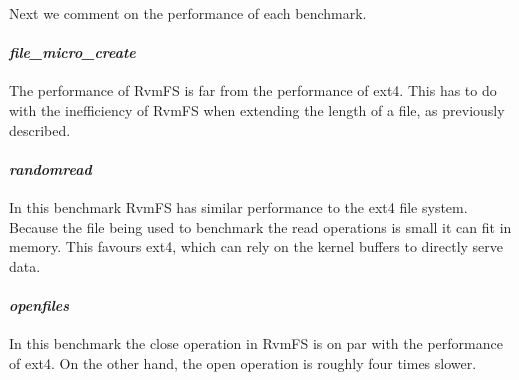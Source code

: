 Next we comment on the performance of each benchmark.

\paragraph{\bf \emph{file\_micro\_create}}
The performance of RvmFS is far from the performance of ext4. This has to do with the inefficiency of RvmFS when extending the length of a file, as previously described.
\paragraph{\bf \emph{randomread}} 
In this benchmark RvmFS has similar performance to the ext4 file system. Because the file being used to benchmark the read operations is small it can fit in memory. This favours ext4, 
which can rely on the kernel buffers to directly serve data.
\paragraph{\bf \emph{openfiles}}
In this benchmark the close operation in RvmFS is on par with the performance of ext4. On the other hand, the open operation is roughly four times slower.





